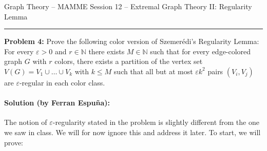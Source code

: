 \documentclass{amsart}
\theoremstyle{plain}
\theoremstyle{definition}
\newcommand{\N}{\mathbb{N}}
\begin{document}
    {\Large Graph Theory -- MAMME}
    {\Large Session 12 -- Extremal Graph Theory II: Regularity Lemma}

    \vspace{0.5cm}

    \hrule

    \vspace{0.5cm}

    \noindent \textbf{Problem 4:}
    Prove the following color version of Szemerédi's Regularity Lemma:
    For every $\varepsilon > 0$ and $r \in \N$ there exists $M \in \N$ such that
    for every edge-colored graph $G$ with $r$ colors, there exists a partition of the vertex set
    $V(G) = V_1 \cup \ldots \cup V_k$ with $k \leq M$ such that
    all but at most $\varepsilon k^2$ pairs $(V_i, V_j)$ are $\varepsilon$-regular in each color class.


    \paragraph{\textbf{Solution (by Ferran Espuña):}}

    The notion of $\varepsilon$-regularity stated in the problem is slightly different from the one we saw in class.
    We will for now ignore this and address it later.
    To start, we will prove:
\end{document}
